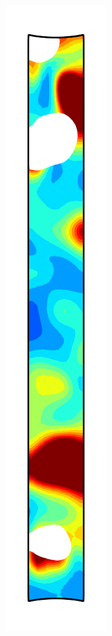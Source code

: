 \begin{figure}[!htb]
\begin{subfigure}{0.08\textwidth}
  \end{subfigure}
  \begin{subfigure}{0.08\textwidth}
    \centering
    \includegraphics[width=\textwidth]{Chapter5/figures/spallation/ep_6}

\end{subfigure}
\end{figure}
